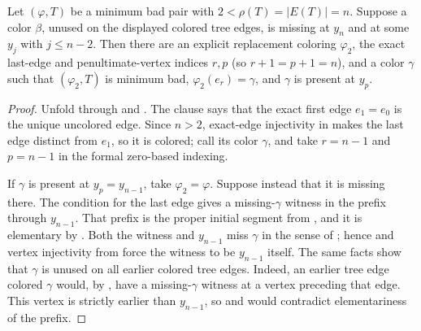 \begin{helper}
Let \((\varphi,T)\) be a minimum bad pair with
\(2<\rho(T)=|E(T)|=n\).  Suppose a color \(\beta\), unused on the
displayed colored tree edges, is missing at \(y_n\) and at some
\(y_j\) with \(j\le n-2\).  Then there are an explicit replacement
coloring \(\varphi_2\), the exact last-edge and penultimate-vertex
indices \(r,p\) (so \(r+1=p+1=n\)), and a color \(\gamma\) such that
\((\varphi_2,T)\) is minimum bad, \(\varphi_2(e_r)=\gamma\), and
\(\gamma\) is present at \(y_p\).
\end{helper}
\begin{proof}
Unfold  through
 and .  The clause
 says that the exact first edge \(e_1=e_0\)
is the unique uncolored edge.  Since \(n>2\), exact-edge injectivity in
 makes the last edge distinct from \(e_1\), so it
is colored; call its color \(\gamma\), and take \(r=n-1\) and
\(p=n-1\) in the formal zero-based indexing.

If \(\gamma\) is present at \(y_p=y_{n-1}\), take
\(\varphi_2=\varphi\).  Suppose instead that it is missing there.  The
condition  for the last edge gives a
missing-\(\gamma\) witness in the prefix through \(y_{n-1}\).  That
prefix is the proper initial segment from
, and it is elementary by
.  Both
the witness and \(y_{n-1}\) miss \(\gamma\) in the sense of
; hence  and
vertex injectivity from  force the witness to be
\(y_{n-1}\) itself.  The same facts show that \(\gamma\) is unused on all
earlier colored tree edges.  Indeed, an earlier tree edge colored
\(\gamma\) would, by , have a
missing-\(\gamma\) witness at a vertex preceding that edge.  This vertex
is strictly earlier than \(y_{n-1}\), so  and
 would contradict elementariness of
the prefix.


\end{proof}
